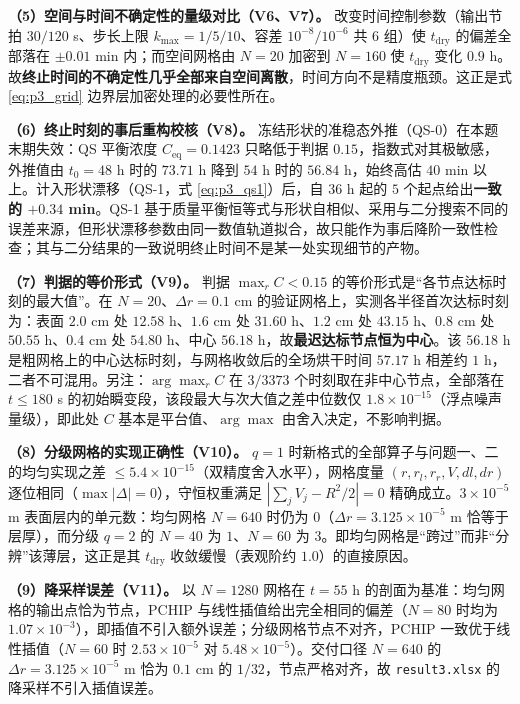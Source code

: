 \textbf{（5）空间与时间不确定性的量级对比（V6、V7）。} 改变时间控制参数（输出节拍 $30/120$ s、步长上限 $k_{\max}=1/5/10$、容差 $10^{-8}/10^{-6}$ 共 $6$ 组）使 $t_{\text{dry}}$ 的偏差全部落在 $\pm0.01$ min 内；而空间网格由 $N=20$ 加密到 $N=160$ 使 $t_{\text{dry}}$ 变化 $0.9$ h。故\textbf{终止时间的不确定性几乎全部来自空间离散}，时间方向不是精度瓶颈。这正是式 \eqref{eq:p3_grid} 边界层加密处理的必要性所在。

\textbf{（6）终止时刻的事后重构校核（V8）。} 冻结形状的准稳态外推（QS-0）在本题末期失效：QS 平衡浓度 $C_{\text{eq}}=0.1423$ 只略低于判据 $0.15$，指数式对其极敏感，外推值由 $t_0=48$ h 时的 $73.71$ h 降到 $54$ h 时的 $56.84$ h，始终高估 $40$ min 以上。计入形状漂移（QS-1，式 \eqref{eq:p3_qs1}）后，自 $36$ h 起的 $5$ 个起点给出\textbf{一致的 $+0.34$ min}。QS-1 基于质量平衡恒等式与形状自相似、采用与二分搜索不同的误差来源，但形状漂移参数由同一数值轨道拟合，故只能作为事后降阶一致性检查；其与二分结果的一致说明终止时间不是某一处实现细节的产物。

\textbf{（7）判据的等价形式（V9）。} 判据 $\max_rC<0.15$ 的等价形式是“各节点达标时刻的最大值”。在 $N=20$、$\Delta r=0.1$ cm 的验证网格上，实测各半径首次达标时刻为：表面 $2.0$ cm 处 $12.58$ h、$1.6$ cm 处 $31.60$ h、$1.2$ cm 处 $43.15$ h、$0.8$ cm 处 $50.55$ h、$0.4$ cm 处 $54.80$ h、中心 $56.18$ h，故\textbf{最迟达标节点恒为中心}。该 $56.18$ h 是粗网格上的中心达标时刻，与网格收敛后的全场烘干时间 $57.17$ h 相差约 $1$ h，二者不可混用。另注：$\arg\max_rC$ 在 $3/3373$ 个时刻取在非中心节点，全部落在 $t\le180$ s 的初始瞬变段，该段最大与次大值之差中位数仅 $1.8\times10^{-15}$（浮点噪声量级），即此处 $C$ 基本是平台值、$\arg\max$ 由舍入决定，不影响判据。

\textbf{（8）分级网格的实现正确性（V10）。} $q=1$ 时新格式的全部算子与问题一、二的均匀实现之差 $\le5.4\times10^{-15}$（双精度舍入水平），网格度量 $(r,r_l,r_r,V,dl,dr)$ 逐位相同（$\max|\Delta|=0$），守恒权重满足 $|\sum_jV_j-R^2/2|=0$ 精确成立。$3\times10^{-5}$ m 表面层内的单元数：均匀网格 $N=640$ 时仍为 $0$（$\Delta r=3.125\times10^{-5}$ m 恰等于层厚），而分级 $q=2$ 的 $N=40$ 为 $1$、$N=60$ 为 $3$。即均匀网格是“跨过”而非“分辨”该薄层，这正是其 $t_{\text{dry}}$ 收敛缓慢（表观阶约 $1.0$）的直接原因。

\textbf{（9）降采样误差（V11）。} 以 $N=1280$ 网格在 $t=55$ h 的剖面为基准：均匀网格的输出点恰为节点，PCHIP 与线性插值给出完全相同的偏差（$N=80$ 时均为 $1.07\times10^{-3}$），即插值不引入额外误差；分级网格节点不对齐，PCHIP 一致优于线性插值（$N=60$ 时 $2.53\times10^{-5}$ 对 $5.48\times10^{-5}$）。交付口径 $N=640$ 的 $\Delta r=3.125\times10^{-5}$ m 恰为 $0.1$ cm 的 $1/32$，节点严格对齐，故 \texttt{result3.xlsx} 的降采样不引入插值误差。

